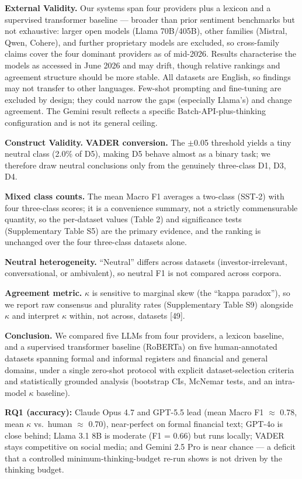 \documentclass[11pt]{article}
\begin{document}
\textbf{External Validity.} Our systems span four providers plus a
lexicon and a supervised transformer baseline --- broader than prior
sentiment benchmarks but not exhaustive: larger open models (Llama
70B/405B), other families (Mistral, Qwen, Cohere), and further
proprietary models are excluded, so cross-family claims cover the four
dominant providers as of mid-2026. Results characterise the models as
accessed in June 2026 and may drift, though relative rankings and
agreement structure should be more stable. All datasets are English, so
findings may not transfer to other languages. Few-shot prompting and
fine-tuning are excluded by design; they could narrow the gaps
(especially Llama's) and change agreement. The Gemini result reflects a
specific Batch-API-plus-thinking configuration and is not its general
ceiling.

\textbf{Construct Validity.} \textbf{VADER conversion.} The $\pm$0.05
threshold yields a tiny neutral class (2.0\% of D5), making D5 behave
almost as a binary task; we therefore draw neutral conclusions only from
the genuinely three-class D1, D3, D4.

\textbf{Mixed class counts.} The mean Macro F1 averages a two-class
(SST-2) with four three-class scores; it is a convenience summary, not a
strictly commensurable quantity, so the per-dataset values (Table 2) and
significance tests (Supplementary Table S5) are the primary evidence,
and the ranking is unchanged over the four three-class datasets alone.

\textbf{Neutral heterogeneity.} ``Neutral'' differs across datasets
(investor-irrelevant, conversational, or ambivalent), so neutral F1 is
not compared across corpora.

\textbf{Agreement metric.} $\kappa$ is sensitive to marginal skew (the ``kappa
paradox''), so we report raw consensus and plurality rates
(Supplementary Table S9) alongside $\kappa$ and interpret $\kappa$ within, not across,
datasets {[}49{]}.

\textbf{Conclusion.} We compared five LLMs from four providers, a
lexicon baseline, and a supervised transformer baseline (RoBERTa) on
five human-annotated datasets spanning formal and informal registers and
financial and general domains, under a single zero-shot protocol with
explicit dataset-selection criteria and statistically grounded analysis
(bootstrap CIs, McNemar tests, and an intra-model $\kappa$ baseline).

\textbf{RQ1 (accuracy):} Claude Opus 4.7 and GPT-5.5 lead (mean Macro F1
$\approx$ 0.78, mean $\kappa$ vs.~human $\approx$ 0.70), near-perfect on formal financial text;
GPT-4o is close behind; Llama 3.1 8B is moderate (F1 = 0.66) but runs
locally; VADER stays competitive on social media; and Gemini 2.5 Pro is
near chance --- a deficit that a controlled minimum-thinking-budget
re-run shows is not driven by the thinking budget.
\end{document}

